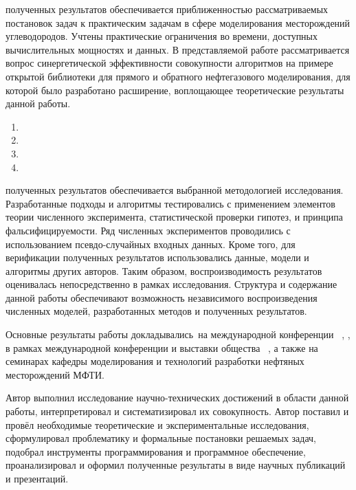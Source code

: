 {\influence} полученных результатов обеспечивается приближенностью рассматриваемых постановок задач к практическим задачам в сфере моделирования месторождений углеводородов. Учтены практические ограничения во времени, доступных вычислительных мощностях и данных. В представляемой работе рассматривается вопрос синергетической эффективности совокупности алгоритмов на примере открытой библиотеки для прямого и обратного нефтегазового моделирования, для которой было разработано расширение, воплощающее теоретические результаты данной работы.

\todo{\methods}

{}
\begin{enumerate}[beginpenalty=10000] %
  \item {}
  \item {}
  \item {}
  \item {}
\end{enumerate}

{\reliability} полученных результатов обеспечивается выбранной методологией исследования.
Разработанные подходы и алгоритмы тестировались с применением элементов теории численного эксперимента, статистической проверки гипотез, и принципа фальсифицируемости.
Ряд численных экспериментов проводились с использованием псевдо-случайных входных данных.
Кроме того, для верификации полученных результатов использовались данные, модели и алгоритмы других авторов.
Таким образом, воспроизводимость результатов оценивалась непосредственно в рамках исследования.
Структура и содержание данной работы обеспечивают возможность независимого воспроизведения численных моделей, разработанных методов и полученных результатов.

{\probation}
Основные результаты работы докладывались~на международной конференции \frqq~\cite{Elizarev2022,Elizarev2020}, , в рамках международной конференции и выставки общества \frqq~\cite{Elizarev_2019}, а также на семинарах кафедры моделирования и технологий разработки нефтяных месторождений МФТИ.

{\contribution} Автор выполнил исследование научно-технических достижений в области данной работы, интерпретировал и систематизировал их совокупность. Автор поставил и провёл необходимые теоретические и экспериментальные исследования, сформулировал проблематику и формальные постановки решаемых задач, подобрал инструменты программирования и программное обеспечение, проанализировал и оформил полученные результаты в виде научных публикаций и презентаций.

